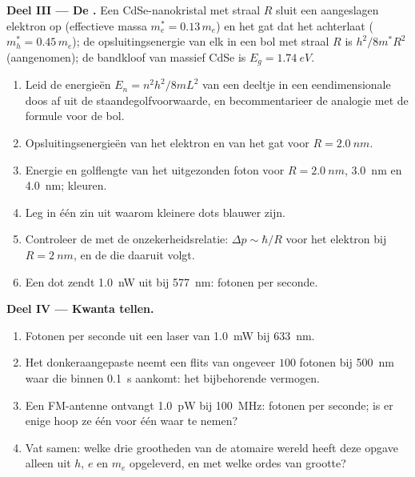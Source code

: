 \begin{problem}
\medskip
\noindent\textbf{Deel III --- De .}
Een CdSe-nanokristal met straal $R$ sluit een aangeslagen elektron op
(effectieve massa $m_e^\ast = 0.13\,m_e$) en het gat dat het achterlaat
($m_h^\ast = 0.45\,m_e$); de opsluitingsenergie van elk in een bol met
straal $R$ is $h^2/8m^\ast R^2$ (aangenomen); de bandkloof van massief CdSe is
$E_g = \qty{1.74}{eV}$.
\begin{enumerate}[resume]
  \item Leid de energieën $E_n = n^2h^2/8mL^2$ van een deeltje in een
        eendimensionale doos af uit de staandegolfvoorwaarde, en
        becommentarieer de analogie met de formule voor de bol.
  \item Opsluitingsenergieën van het elektron en van het gat voor
        $R = \qty{2.0}{nm}$.
  \item Energie en golflengte van het uitgezonden foton voor $R = \qty{2.0}{nm}$,
        \qty{3.0}{nm} en \qty{4.0}{nm}; kleuren.
  \item Leg in één zin uit waarom kleinere dots blauwer zijn.
  \item Controleer de  met de onzekerheidsrelatie:
        $\Delta p \sim \hbar/R$ voor het elektron bij $R = \qty{2}{nm}$, en de
         die daaruit volgt.
  \item Een dot zendt \qty{1.0}{nW} uit bij \qty{577}{nm}: fotonen per seconde.
\end{enumerate}

\medskip
\noindent\textbf{Deel IV --- Kwanta tellen.}
\begin{enumerate}[resume]
  \item Fotonen per seconde uit een laser van \qty{1.0}{mW} bij \qty{633}{nm}.
  \item Het donkeraangepaste  neemt een flits van ongeveer $100$ fotonen bij
        \qty{500}{nm} waar die binnen \qty{0.1}{s} aankomt: het bijbehorende vermogen.
  \item Een FM-antenne ontvangt \qty{1.0}{pW} bij \qty{100}{MHz}: fotonen per
        seconde; is er enige hoop ze één voor één waar te nemen?
  \item Vat samen: welke drie grootheden van de atomaire wereld heeft deze
        opgave alleen uit $h$, $e$ en $m_e$ opgeleverd, en met welke
        ordes van grootte?
\end{enumerate}
\end{problem}
